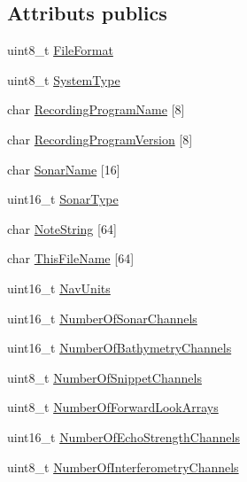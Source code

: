 \subsection*{Attributs publics}
\begin{DoxyCompactItemize}
\item 
uint8\+\_\+t \hyperlink{structXtfFileHeader_a4316f8ddfc7a8aedc2ab48c57985cead}{File\+Format}
\item 
uint8\+\_\+t \hyperlink{structXtfFileHeader_a6f3eec78f338aa8f78a914d5e11eb954}{System\+Type}
\item 
char \hyperlink{structXtfFileHeader_a6c80b9e5aad45b5d9fa6473fd032ac18}{Recording\+Program\+Name} \mbox{[}8\mbox{]}
\item 
char \hyperlink{structXtfFileHeader_a5082997e4ac14d21f4a23bb33b1586a6}{Recording\+Program\+Version} \mbox{[}8\mbox{]}
\item 
char \hyperlink{structXtfFileHeader_ac6fbf63597b953a9bb4550cb6328714b}{Sonar\+Name} \mbox{[}16\mbox{]}
\item 
uint16\+\_\+t \hyperlink{structXtfFileHeader_a5fab4bc57578ce290587de30618a44be}{Sonar\+Type}
\item 
char \hyperlink{structXtfFileHeader_aa28fc6fe135e8f48ccb029d5af2e69a2}{Note\+String} \mbox{[}64\mbox{]}
\item 
char \hyperlink{structXtfFileHeader_ad14ce2faf476f95467619c8c6f67950d}{This\+File\+Name} \mbox{[}64\mbox{]}
\item 
uint16\+\_\+t \hyperlink{structXtfFileHeader_aa39461695c29091c125e9044ee6d89e8}{Nav\+Units}
\item 
uint16\+\_\+t \hyperlink{structXtfFileHeader_ab6f5f727287c8a02037cce63c5460ee1}{Number\+Of\+Sonar\+Channels}
\item 
uint16\+\_\+t \hyperlink{structXtfFileHeader_afea2149b1bf036eeed83ad103ec113a6}{Number\+Of\+Bathymetry\+Channels}
\item 
uint8\+\_\+t \hyperlink{structXtfFileHeader_a646498f4f1a07044827eee631b0c2643}{Number\+Of\+Snippet\+Channels}
\item 
uint8\+\_\+t \hyperlink{structXtfFileHeader_aeabf307d9c414577ace662cdadf3a0c3}{Number\+Of\+Forward\+Look\+Arrays}
\item 
uint16\+\_\+t \hyperlink{structXtfFileHeader_a603e8d0b78f105511178e866215c810a}{Number\+Of\+Echo\+Strength\+Channels}
\item 
uint8\+\_\+t \hyperlink{structXtfFileHeader_aca1155f0ad5bef9dadeadea7a39e2fd3}{Number\+Of\+Interferometry\+Channels}
\item 

\end{DoxyCompactItemize}
